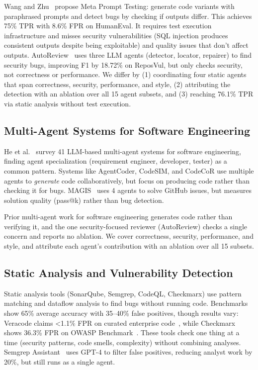 \documentclass[10pt,twocolumn]{article}
\begin{document}
Wang and Zhu~\cite{wang2024metamorphic} propose Meta Prompt Testing: generate code variants with paraphrased prompts and detect bugs by checking if outputs differ. This achieves 75\% TPR with 8.6\% FPR on HumanEval. It requires test execution infrastructure and misses security vulnerabilities (SQL injection produces consistent outputs despite being exploitable) and quality issues that don't affect outputs. AutoReview~\cite{autoreview2025} uses three LLM agents (detector, locator, repairer) to find security bugs, improving F1 by 18.72\% on ReposVul, but only checks security, not correctness or performance. We differ by (1) coordinating four static agents that span correctness, security, performance, and style, (2) attributing the detection with an ablation over all 15 agent subsets, and (3) reaching 76.1\% TPR via static analysis without test execution.

\subsection{Multi-Agent Systems for Software Engineering}

He et al.~\cite{he2024multiagent} survey 41 LLM-based multi-agent systems for software engineering, finding agent specialization (requirement engineer, developer, tester) as a common pattern. Systems like AgentCoder, CodeSIM, and CodeCoR use multiple agents to \emph{generate} code collaboratively, but focus on producing code rather than checking it for bugs. MAGIS~\cite{magis2024} uses 4 agents to solve GitHub issues, but measures solution quality (pass@k) rather than bug detection.

Prior multi-agent work for software engineering generates code rather than verifying it, and the one security-focused reviewer (AutoReview) checks a single concern and reports no ablation. We cover correctness, security, performance, and style, and attribute each agent's contribution with an ablation over all 15 subsets.

\subsection{Static Analysis and Vulnerability Detection}

Static analysis tools (SonarQube, Semgrep, CodeQL, Checkmarx) use pattern matching and dataflow analysis to find bugs without running code. Benchmarks~\cite{johnson2024sast} show 65\% average accuracy with 35--40\% false positives, though results vary: Veracode claims <1.1\% FPR on curated enterprise code~\cite{veracode2024}, while Checkmarx shows 36.3\% FPR on OWASP Benchmark~\cite{owasp2024}. These tools check one thing at a time (security patterns, code smells, complexity) without combining analyses. Semgrep Assistant~\cite{semgrep2025} uses GPT-4 to filter false positives, reducing analyst work by 20\%, but still runs as a single agent.
\end{document}
